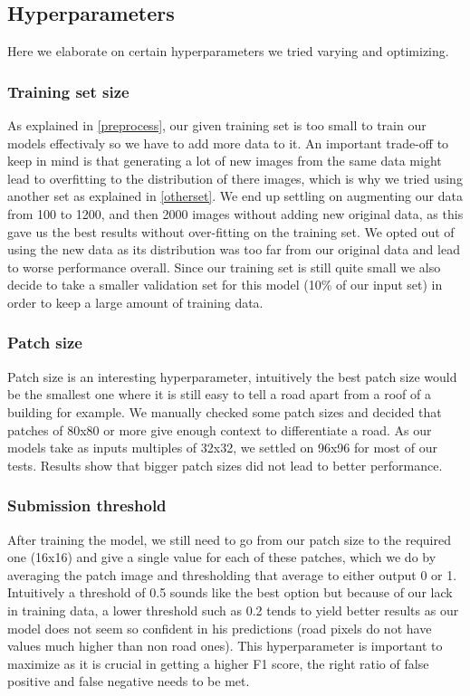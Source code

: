 \documentclass[10pt,conference,compsocconf]{IEEEtran}
\begin{document}
\subsection{Hyperparameters}
Here we elaborate on certain hyperparameters we tried varying and optimizing.
\subsubsection{Training set size}
As explained in \ref{preprocess}, our given training set is too small to train our models effectivaly so we have to add more data to it. An important trade-off to keep in mind is that generating a lot of new images from the same data might lead to overfitting to the distribution of there images, which is why we tried using another set as explained in \ref{otherset}. We end up settling on augmenting our data from 100 to 1200, and then 2000 images without adding new original data, as this gave us the best results without over-fitting on the training set. We opted out of using the new data as its distribution was too far from our original data and lead to worse performance overall.\newline
Since our training set is still quite small we also decide to take a smaller validation set for this model (10\% of our input set) in order to keep a large amount of training data.
\subsubsection{Patch size}
Patch size is an interesting hyperparameter, intuitively the best patch size would be the smallest one where it is still easy to tell a road apart from a roof of a building for example. We manually checked some patch sizes and decided that patches of 80x80 or more give enough context to differentiate a road. As our models take as inputs multiples of 32x32, we settled on 96x96 for most of our tests. Results show that bigger patch sizes did not lead to better performance.
\subsubsection{Submission threshold}
After training the model, we still need to go from our patch size to the required one (16x16) and give a single value for each of these patches, which we do by averaging the patch image and thresholding that average to either output 0 or 1. Intuitively a threshold of 0.5 sounds like the best option but because of our lack in training data, a lower threshold such as 0.2 tends to yield better results as our model does not seem so confident in his predictions (road pixels do not have values much higher than non road ones). This hyperparameter is important to maximize as it is crucial in getting a higher F1 score, the right ratio of false positive and false negative needs to be met.
\end{document}
